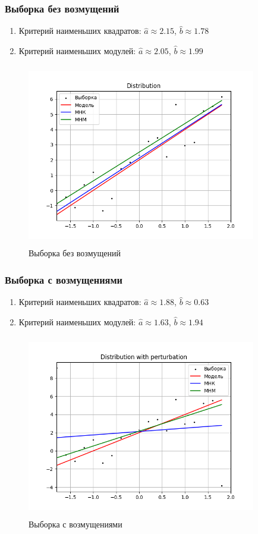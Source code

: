\documentclass[a4paper]{article}
\begin{document}
	\subsubsection{Выборка без возмущений}
		\begin{enumerate}
			\item{Критерий наименьших квадратов:}
			$\hat{a}\approx 2.15$, $\hat{b}\approx 1.78$
			\item{Критерий наименьших модулей:}
			$\hat{a}\approx 2.05$, $\hat{b}\approx 1.99$
		\end{enumerate}
		\begin{figure}[H]
			\centering
			\includegraphics[width = 10cm, height = 8cm]{./lab2_2/pictures/Distribution.png}
			\caption{Выборка без возмущений}
			\label{w/o_pert}
		\end{figure}
	
	\subsubsection{Выборка с возмущениями}
		\begin{enumerate}
			\item{Критерий наименьших квадратов:}
			$\hat{a}\approx 1.88$, $\hat{b}\approx 0.63$
			\item{Критерий наименьших модулей:}
			$\hat{a}\approx 1.63$, $\hat{b}\approx 1.94$
		\end{enumerate}
		\begin{figure}[H]
			\centering
			\includegraphics[width = 10cm, height = 8cm]{./lab2_2/pictures/Distribution with perturbation.png}
			\caption{Выборка с возмущениями}
			\label{w_pert}
		\end{figure}
\end{document}
